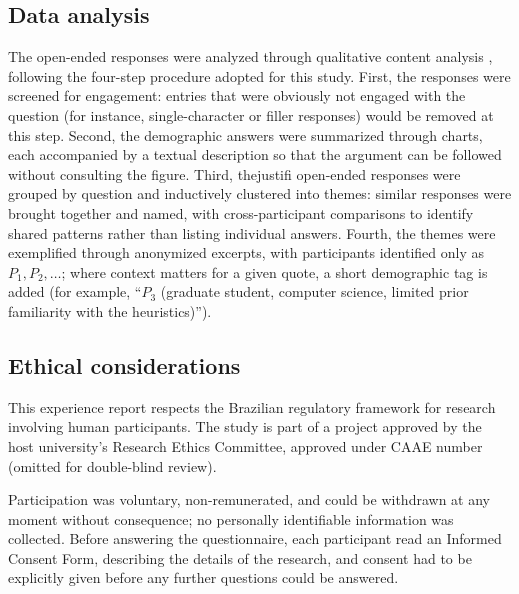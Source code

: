
\subsection{Data analysis}

The open-ended responses were analyzed through qualitative content analysis \cite{bardin2016analise}, following the four-step procedure adopted for this study. First, the responses were screened for engagement: entries that were obviously not engaged with the question (for instance, single-character or filler responses) would be removed at this step. Second, the demographic answers were summarized through charts, each accompanied by a textual description so that the argument can be followed without consulting the figure. Third, thejustifi open-ended responses were grouped by question and inductively clustered into themes: similar responses were brought together and named, with cross-participant comparisons to identify shared patterns rather than listing individual answers. Fourth, the themes were exemplified through anonymized excerpts, with participants identified only as $P_1, P_2, \ldots$; where context matters for a given quote, a short demographic tag is added (for example, ``$P_3$ (graduate student, computer science, limited prior familiarity with the heuristics)'').

\subsection{Ethical considerations}
\label{sec:ethics}

This experience report respects the Brazilian regulatory framework for research involving human participants. The study is part of a project approved by the host university's Research Ethics Committee, approved under CAAE number (omitted for double-blind review).

Participation was voluntary, non-remunerated, and could be withdrawn at any moment without consequence; no personally identifiable information was collected. Before answering the questionnaire, each participant read an Informed Consent Form, describing the details of the research, and consent had to be explicitly given before any further questions could be answered.
